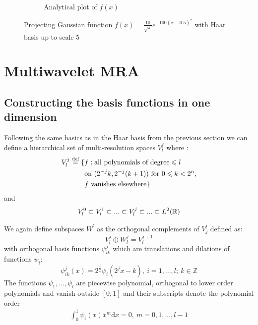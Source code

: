 \documentclass[../master_thesis.tex]{subfiles}
\begin{document}
\begin{figure}[h!]
\begin{subfigure}[b]{0.49\linewidth}
    \caption{Analytical plot of $f(x)$}
  \end{subfigure}
  \caption{Projecting Gaussian function $f(x) = \frac{10}{\sqrt{\pi}}e^{-100(x - 0.5)^2}$ with
  Haar basis up to scale 5}
  \label{fig:Hargaussproject}
\end{figure}


\section{Multiwavelet \ac{MRA}}
\subsection{Constructing the basis functions in one dimension}
Following the same basics as in the Haar basis from the previous section we can
define a hierarchical set of multi-resolution spaces $V^j_l$ where \cite{Frediani:2013}:
\begin{align}
  \begin{split}
    V^j_l \stackrel{\text{def}}{=} \{&f: \text{all polynomials of degree} \leqslant
    l\  \\
    &\text{on}\  (2^{-j}k,2^{-j}(k+1))\ \text{for}\ 0\leqslant k < 2^{n},\\
    &f\  \text{vanishes elsewhere}\}
  \end{split}
\end{align}
and
\begin{equation}
  V^0_l \subset V^1_l \subset ... \subset V_l^j \subset ... \subset L^2(\mathbb{R})
\end{equation}

We again define subspaces $W^^l$ as the orthogonal complements of $V^l_j$
\cite{Alpert1993} defined as:
\begin{equation}
  V_l^j \oplus W^j_l = V_l^{j+1}
\end{equation}
 with orthogonal basis functions  $\psi^j_{lk}$ which are translations and dilations of functions $\psi_i$:
 \begin{equation}
   \psi^j_{ik}(x) = 2^\frac{j}{2}\psi_i(2^jx-k), \ i=1, ...,l;\ k \in \mathbb{Z}\label{eq:mwbasisfuncs}
 \end{equation}
 The functions $\psi_1, ...,\psi_l$ are piecewise polynomial, orthogonal to lower order polynomials and
 vanish outside $[0,1]$ and their subscripts denote the polynomial order \cite{Alpert1993}
\begin{align}
  \int_0^1\psi_i(x)x^m \text{d}x = 0,\ m = 0, 1, ..., l-1
\end{align}
\end{document}
